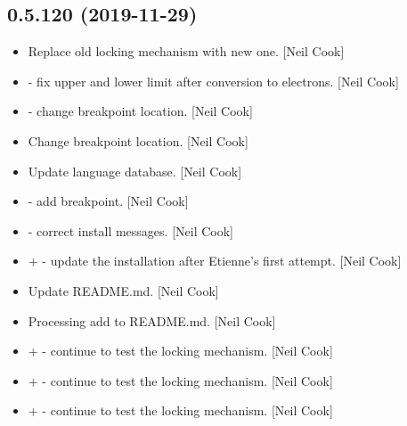 \documentclass[a4paper,10pt,english]{report}
\begin{document}
\subsection{0.5.120 (2019-11-29)}
\label{\detokenize{misc/changelog:id23}}\begin{itemize}
\item {} 
Replace old locking mechanism with new one. {[}Neil Cook{]}

\item {} 
 - fix upper and lower limit after conversion
to electrons. {[}Neil Cook{]}

\item {} 
 - change breakpoint location. {[}Neil
Cook{]}

\item {} 
Change breakpoint location. {[}Neil Cook{]}

\item {} 
Update language database. {[}Neil Cook{]}

\item {} 
 - add breakpoint. {[}Neil Cook{]}

\item {} 
 - correct install messages.
{[}Neil Cook{]}

\item {} 
 +  -
update the installation after Etienne’s first attempt. {[}Neil Cook{]}

\item {} 
Update README.md. {[}Neil Cook{]}

\item {} 
Processing add to README.md. {[}Neil Cook{]}

\item {} 
 +  - continue to test the locking mechanism. {[}Neil
Cook{]}

\item {} 
 +  - continue to test the locking mechanism. {[}Neil
Cook{]}

\item {} 
 +  - continue to test the locking mechanism. {[}Neil
Cook{]}


\end{itemize}
\end{document}
